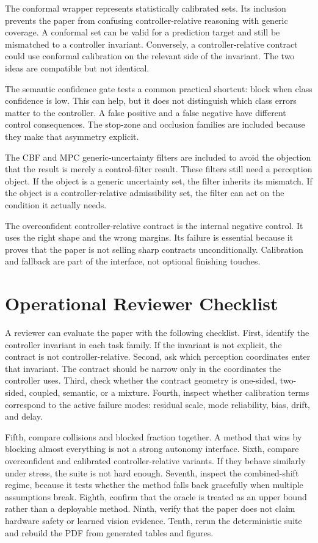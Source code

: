 \documentclass{article}
\begin{document}
The conformal wrapper represents statistically calibrated sets. Its inclusion prevents the paper from confusing controller-relative reasoning with generic coverage. A conformal set can be valid for a prediction target and still be mismatched to a controller invariant. Conversely, a controller-relative contract could use conformal calibration on the relevant side of the invariant. The two ideas are compatible but not identical.

The semantic confidence gate tests a common practical shortcut: block when class confidence is low. This can help, but it does not distinguish which class errors matter to the controller. A false positive and a false negative have different control consequences. The stop-zone and occlusion families are included because they make that asymmetry explicit.

The CBF and MPC generic-uncertainty filters are included to avoid the objection that the result is merely a control-filter result. These filters still need a perception object. If the object is a generic uncertainty set, the filter inherits its mismatch. If the object is a controller-relative admissibility set, the filter can act on the condition it actually needs.

The overconfident controller-relative contract is the internal negative control. It uses the right shape and the wrong margins. Its failure is essential because it proves that the paper is not selling sharp contracts unconditionally. Calibration and fallback are part of the interface, not optional finishing touches.

\section{Operational Reviewer Checklist}

A reviewer can evaluate the paper with the following checklist. First, identify the controller invariant in each task family. If the invariant is not explicit, the contract is not controller-relative. Second, ask which perception coordinates enter that invariant. The contract should be narrow only in the coordinates the controller uses. Third, check whether the contract geometry is one-sided, two-sided, coupled, semantic, or a mixture. Fourth, inspect whether calibration terms correspond to the active failure modes: residual scale, mode reliability, bias, drift, and delay.

Fifth, compare collisions and blocked fraction together. A method that wins by blocking almost everything is not a strong autonomy interface. Sixth, compare overconfident and calibrated controller-relative variants. If they behave similarly under stress, the suite is not hard enough. Seventh, inspect the combined-shift regime, because it tests whether the method falls back gracefully when multiple assumptions break. Eighth, confirm that the oracle is treated as an upper bound rather than a deployable method. Ninth, verify that the paper does not claim hardware safety or learned vision evidence. Tenth, rerun the deterministic suite and rebuild the PDF from generated tables and figures.
\end{document}
